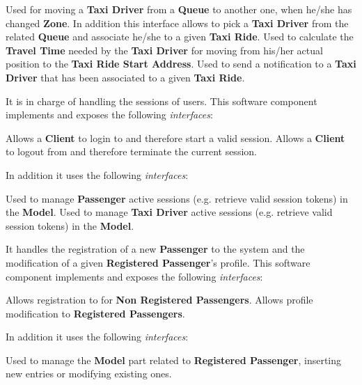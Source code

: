 \begin{itemize}
\begin{itemize}
\begin{itemize}
			 Used for moving a \textbf{Taxi Driver} from a \textbf{Queue} to another one, when he/she has changed \textbf{Zone}.
			In addition this interface allows to pick a \textbf{Taxi Driver} from the related \textbf{Queue} and associate he/she to a given \textbf{Taxi Ride}.
			 Used to calculate the \textbf{Travel Time} needed by the \textbf{Taxi Driver} for moving from his/her actual position to the \textbf{Taxi Ride Start Address}.
				Used to send a notification to a \textbf{Taxi Driver} that has been associated to a given \textbf{Taxi Ride}.
		\end{itemize}
		
		It is in charge of handling the sessions of \myTaxiService{} users.
		This software component implements and exposes the following \textit{interfaces}:
		\begin{itemize}
			 Allows a \textbf{Client} to login to \myTaxiService{} and therefore start a valid session.
			 Allows a \textbf{Client} to logout from \myTaxiService{} and therefore terminate the current session.
		\end{itemize}
		In addition it uses the following \textit{interfaces}:
		\begin{itemize}
			 Used to manage \textbf{Passenger} active sessions (e.g. retrieve valid session tokens) in the \textbf{Model}.
			 Used to manage \textbf{Taxi Driver} active sessions (e.g. retrieve valid session tokens) in the \textbf{Model}.
		\end{itemize}
		
		\itemBold{Profile Manager}
		It handles the registration of a new \textbf{Passenger} to the system and the modification of a given \textbf{Registered Passenger}'s profile.
		This software component implements and exposes the following \textit{interfaces}:
		\begin{itemize}
			 Allows registration to \myTaxiService{} for \textbf{Non Registered Passengers}.
			 Allows profile modification to \textbf{Registered Passengers}.
		\end{itemize}
		In addition it uses the following \textit{interfaces}:
		\begin{itemize}
			 Used to manage the \textbf{Model} part related to \textbf{Registered Passenger}, inserting new entries or modifying existing ones.
		\end{itemize}


\end{itemize}
\end{itemize}
